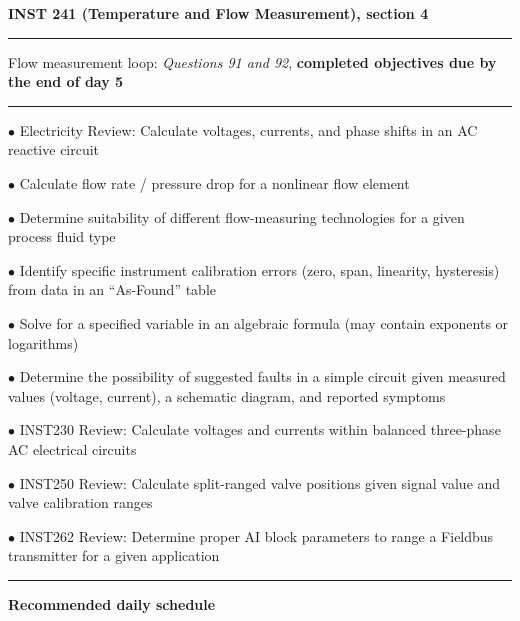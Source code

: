 
\centerline{\bf INST 241 (Temperature and Flow Measurement), section 4} \bigskip 
 
\vskip 10pt

\hrule \vskip 5pt
\noindent
{}

\vskip 5pt

\noindent Flow measurement loop: {\it Questions 91 and 92}, {\bf completed objectives due by the end of day 5}

\vskip 10pt

\hrule \vskip 5pt
\noindent
{}

\vskip 5pt


\vskip 2pt 

\item{$\bullet$} Electricity Review: Calculate voltages, currents, and phase shifts in an AC reactive circuit
\item{$\bullet$} Calculate flow rate / pressure drop for a nonlinear flow element
\item{$\bullet$} Determine suitability of different flow-measuring technologies for a given process fluid type
\item{$\bullet$} Identify specific instrument calibration errors (zero, span, linearity, hysteresis) from data in an ``As-Found'' table
\item{$\bullet$} Solve for a specified variable in an algebraic formula (may contain exponents or logarithms)
\item{$\bullet$} Determine the possibility of suggested faults in a simple circuit given measured values (voltage, current), a schematic diagram, and reported symptoms
\item{$\bullet$} INST230 Review: Calculate voltages and currents within balanced three-phase AC electrical circuits
\item{$\bullet$} INST250 Review: Calculate split-ranged valve positions given signal value and valve calibration ranges
\item{$\bullet$} INST262 Review: Determine proper AI block parameters to range a Fieldbus transmitter for a given application

\vskip 10pt



\hrule \vskip 5pt

\centerline{\bf Recommended daily schedule} 

